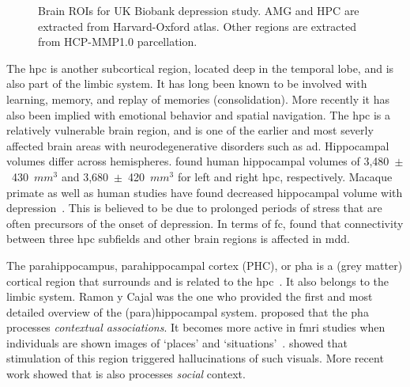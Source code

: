 \begin{figure}[t]
  \hspace{0.08\textwidth}
  \caption{
    Brain ROIs for UK Biobank depression study.
    AMG and HPC are extracted from Harvard-Oxford atlas.
    Other regions are extracted from HCP-MMP1.0 parcellation.
  }
  \label{fig:ukb-brain-regions}
\end{figure}


The \gls{hpc} is another subcortical region, located deep in the temporal lobe, and is also part of the limbic system.
It has long been known to be involved with learning, memory, and replay of memories (consolidation).
More recently it has also been implied with emotional behavior and spatial navigation.
The \gls{hpc} is a relatively vulnerable brain region, and is one of the earlier and most severly affected brain areas with neurodegenerative disorders such as \gls{ad}.
Hippocampal volumes differ across hemispheres.
\textcite{McHugh2007} found human hippocampal volumes of 3,480~$\pm$~430~$mm^3$ and 3,680~$\pm$~420~$mm^3$ for left and right \gls{hpc}, respectively.
Macaque primate as well as human studies have found decreased hippocampal volume with depression~\parencite{Campbell2004, Malykhin2010, Brown2014, Schmaal2016}.
This is believed to be due to prolonged periods of stress that are often precursors of the onset of depression.
In terms of \gls{fc}, \textcite{Hao2020} found that connectivity between three \gls{hpc} subfields and other brain regions is affected in \gls{mdd}.

The parahippocampus, parahippocampal cortex (PHC), or \gls{pha} is a (grey matter) cortical region that surrounds and is related to the \gls{hpc}~\parencite{Burwell2000}.
It also belongs to the limbic system.
Ramon y Cajal was the one who provided the first and most detailed overview of the (para)hippocampal system.
\textcite{Aminoff2013} proposed that the \gls{pha} processes \emph{contextual associations}.
It becomes more active in \gls{fmri} studies when individuals are shown images of `places' and `situations'~\parencite{Epstein1998}.
\textcite{Megevand2014} showed that stimulation of this region triggered hallucinations of such visuals.
More recent work showed that is also processes \emph{social} context.

